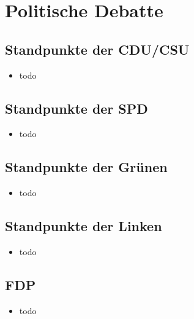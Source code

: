 \section{Politische Debatte}
  \subsection{Standpunkte der CDU/CSU}
    \begin{frame}
       \begin{itemize}
        \item todo
  
      \end{itemize}
    \end{frame}
     \subsection{Standpunkte der SPD}
    \begin{frame}
       \begin{itemize}
        \item todo
  
      \end{itemize}
    \end{frame}
         \subsection{Standpunkte der Grünen}
    \begin{frame}
       \begin{itemize}
        \item todo
  
      \end{itemize}
    \end{frame}
             \subsection{Standpunkte der Linken}
    \begin{frame}
       \begin{itemize}
        \item todo
  
      \end{itemize}
    \end{frame}
                 \subsection{FDP}
    \begin{frame}
       \begin{itemize}
        \item todo
  
      \end{itemize}
    \end{frame}


